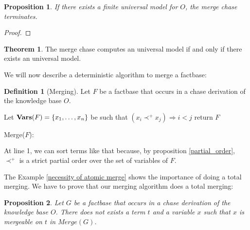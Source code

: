\documentclass{article}
\newtheorem{proposition}{Proposition}[section]
\theoremstyle{definition}
\newtheorem{definition}{Definition}[section]
\newtheorem{theorem}{Theorem}[section]
\theoremstyle{remark}
\newcommand{\Vars}{\textbf{Vars}}
\newcommand{\Merge}{\textit{Merge}}
\begin{document}
\begin{proposition}
If there exists a finite universal model for $O$, the merge chase terminates.
\end{proposition}

\begin{proof}

\end{proof}


\begin{theorem}
The merge chase computes an universal model if and only if there exists an universal model.
\end{theorem}

We will now describe a deterministic algorithm to merge a factbase:

\begin{definition}[Merging]
Let $F$ be a factbase that occurs in a chase derivation of the knowledge base $O$.

\begin{algorithm}[H]
\SetAlgoLined


    Let $\textbf{\Vars}(F) = \{x_1,\ldots, x_n\}$ be such that $(x_i \prec^+ x_j) \Rightarrow i < j$ \;
return $F$
\caption{Merge($F$):}


\end{algorithm}
At line 1, we can sort terms like that because, by proposition \ref{partial_order}, $\prec^+$ is a strict partial order over the set of variables of $F$.
\end{definition}

The Example \ref{necessity of atomic merge} shows the importance of doing a total merging. We have to prove that our merging algorithm does a total merging:

\begin{proposition}\label{no_more_siblings}
Let $G$ be a factbase that occurs in a chase derivation of the knowledge base $O$. There does not exists a term $t$ and a variable $x$ such that $x$ is mergeable on $t$ in $\Merge(G)$.
\end{proposition}
\end{document}
